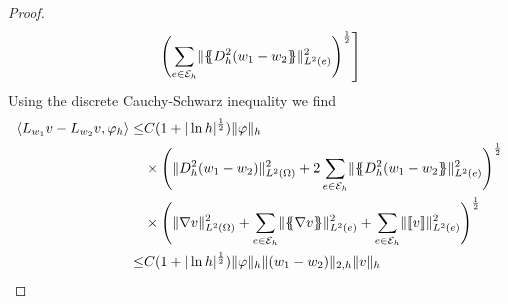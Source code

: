\begin{proof}
\begin{align}
				\left. \left(\sum_{e \in \mathcal{E}_h} \lVert \{\!\!\{ D_h^2 (w_1-w_2 \}\!\!\} \rVert_{L^2(e)}^2 \right)^{\frac 1 2} 
			\right] \label{eq: difference estimate number two}
	\end{align}
	Using the discrete Cauchy-Schwarz inequality we find
	\begin{align}
	\bilin{L_{w_1}v- L_{w_2} v} {\varphi_h} 
		\leq& C (1+|\ln h|^{\frac 1 2})\eNorm{\varphi} 
		\nonumber \\
		&\times
			\left(
				\LTwonorm{\hess{(w_1 -w_2)}}^2 
				+ 2\sum_{e \in \edges} \LTwonormE{\average{\hess{(w_1-w_2}}}^2
			\right)^{\frac 1 2} \nonumber \\
	   	&\times
			\left(
			\LTwonorm{\nabla v}^2 
			+ \sum_{e \in \edges} \LTwonormE{\average{\nabla v}}^2
			+\sum_{e \in \edges} \LTwonormE{\jump v}^2
			\right)^{\frac 1 2} \nonumber \\
		\leq& C (1+|\ln h|^{\frac 1 2})\eNorm{\varphi} 	\eNormDTwo{{(w_1-w_2)}} \eNorm{v}
	\end{align}
 \phantom{blub}
\end{proof}

